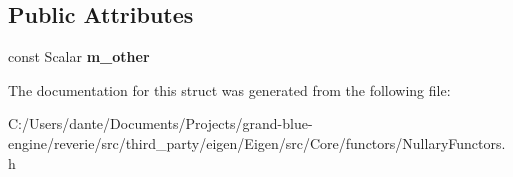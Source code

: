 \subsection*{Public Attributes}
\begin{DoxyCompactItemize}
\item 
\mbox{\label{struct_eigen_1_1internal_1_1scalar__constant__op_aa47c9cdf21a888ae9fd86a96a6157424}} 
const Scalar {\bfseries m\+\_\+other}
\end{DoxyCompactItemize}


The documentation for this struct was generated from the following file\+:\begin{DoxyCompactItemize}
\item 
C\+:/\+Users/dante/\+Documents/\+Projects/grand-\/blue-\/engine/reverie/src/third\+\_\+party/eigen/\+Eigen/src/\+Core/functors/Nullary\+Functors.\+h\end{DoxyCompactItemize}
